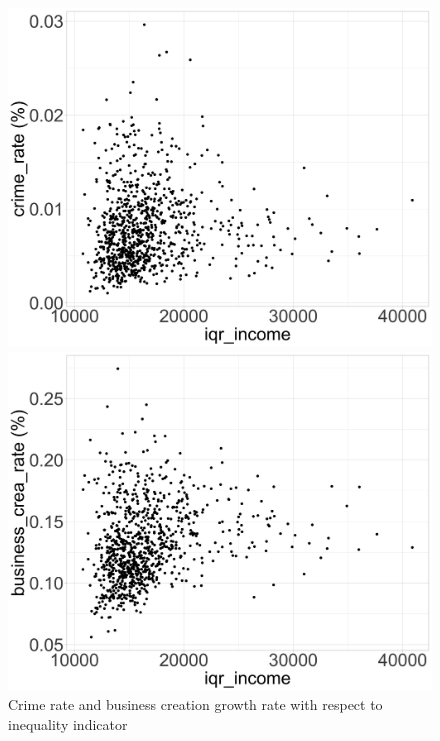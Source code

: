 \begin{figure}[htbp]
    \begin{minipage}{0.5\textwidth}
      \centering
      \includegraphics[width=\textwidth]{Exercise_3/OUTPUT/cr_iqr.png}
    \end{minipage}%
    \begin{minipage}{0.5\textwidth}
      \centering
      \includegraphics[width=\textwidth]{Exercise_3/OUTPUT/bcr_iqr.png}
    \end{minipage}
    \caption{Crime rate and business creation growth rate with respect to inequality indicator}
    \label{ineq}
  \end{figure}
